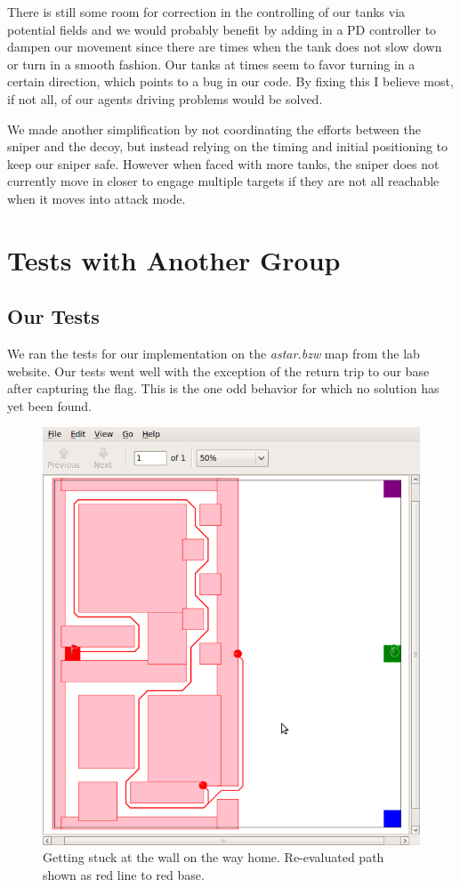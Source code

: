There is still some room for correction in the controlling of our tanks via potential fields and we would probably benefit by adding in a PD controller to dampen our movement since there are times when the tank does not slow down or turn in a smooth fashion.  Our tanks at times seem to favor turning in a certain direction, which points to a bug in our code.  By fixing this I believe most, if not all, of our agents driving problems would be solved.

We made another simplification by not coordinating the efforts between the sniper and the decoy, but instead relying on the timing and initial positioning to keep our sniper safe.  However when faced with more tanks, the sniper does not currently move in closer to engage multiple targets if they are not all reachable when it moves into attack mode.

\section{Tests with Another Group}
\subsection{Our Tests}
We ran the tests for our implementation on the \emph{astar.bzw} map from the lab website. Our tests went well with the exception of the return trip to our base after capturing the flag.  This is the one odd behavior for which no solution has yet been found.
\par
\begin{figure}\label{fig:stuck}
\begin{center}
\includegraphics[width=\textwidth]{07re-evaluate-path.png}
\caption{Getting stuck at the wall on the way home. Re-evaluated path shown as red line to red base.}
\end{center}
\end{figure}

